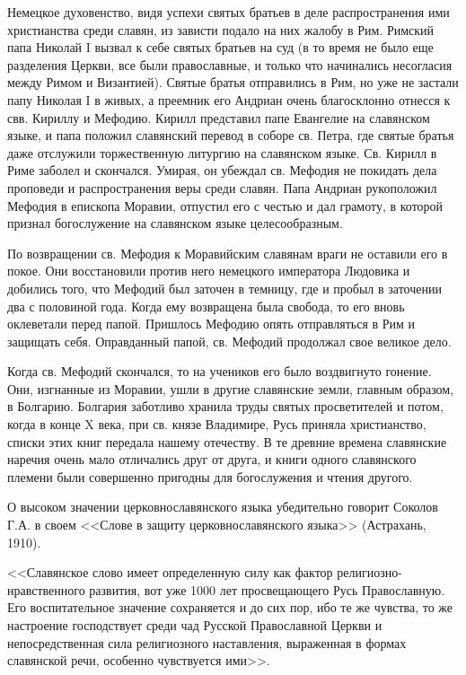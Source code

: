 \documentclass[11pt,a4paper,oneside]{memoir}
\begin{document}
    Немецкое духовенство, видя успехи святых братьев в деле распространения ими христианства среди славян, из зависти подало на них жалобу в Рим. Римский папа Николай I вызвал к себе святых братьев на суд (в то время не было еще разделения Церкви, все были православные, и только что начинались несогласия между Римом и Византией). Святые братья отправились в Рим, но уже не застали папу Николая I в живых, а преемник его Андриан очень благосклонно отнесся к свв. Кириллу и Мефодию. Кирилл представил папе Евангелие на славянском языке, и папа положил славянский перевод в соборе св. Петра, где святые братья даже отслужили торжественную литургию на славянском языке. Св. Кирилл в Риме заболел и скончался. Умирая, он убеждал св. Мефодия не покидать дела проповеди и распространения веры среди славян. Папа Андриан рукоположил Мефодия в епископа Моравии, отпустил его с честью и дал грамоту, в которой признал богослужение на славянском языке целесообразным.
    
    По возвращении св. Мефодия к Моравийским славянам враги не оставили его в покое. Они восстановили против него немецкого императора Людовика и добились того, что Мефодий был заточен в темницу, где и пробыл в заточении два с половиной года. Когда ему возвращена была свобода, то его вновь оклеветали перед папой. Пришлось Мефодию опять отправляться в Рим и защищать себя. Оправданный папой, св. Мефодий продолжал свое великое дело.
    
    Когда св. Мефодий скончался, то на учеников его было воздвигнуто гонение. Они, изгнанные из Моравии, ушли в другие славянские земли, главным образом, в Болгарию. Болгария заботливо хранила труды святых просветителей и потом, когда в конце X века, при св. князе Владимире, Русь приняла христианство, списки этих книг передала нашему отечеству. В те древние времена славянские наречия очень мало отличались друг от друга, и книги одного славянского племени были совершенно пригодны для богослужения и чтения другого.
    
    О высоком значении церковнославянского языка убедительно говорит Соколов Г.А. в своем <<Слове в защиту церковнославянского языка>> (Астрахань, 1910).
    
    <<Славянское слово имеет определенную силу как фактор религиозно-нравственного развития, вот уже 1000 лет просвещающего Русь Православную. Его воспитательное значение сохраняется и до сих пор, ибо те же чувства, то же настроение господствует среди чад Русской Православной Церкви и непосредственная сила религиозного наставления, выраженная в формах славянской речи, особенно чувствуется ими>>.
    
\end{document}
